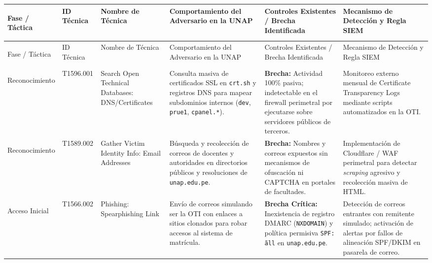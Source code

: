 \begin{center}
\footnotesize
\setlength{\tabcolsep}{2.5pt}
\renewcommand{\arraystretch}{1.28}
\begin{longtable}{>{\bfseries\raggedright\arraybackslash}p{2.4cm} >{\ttfamily\raggedright\arraybackslash}p{1.9cm} >{\raggedright\arraybackslash}p{2.3cm} >{\raggedright\arraybackslash}p{2.9cm} >{\raggedright\arraybackslash}p{2.9cm} >{\raggedright\arraybackslash}p{3.1cm}}
\toprule
\rowcolor{outermarginbgcolor}
Fase / Táctica & ID Técnica & Nombre de Técnica & Comportamiento del Adversario en la UNAP & Controles Existentes / Brecha Identificada & Mecanismo de Detección y Regla SIEM \\
\midrule
\endfirsthead
\toprule
\rowcolor{outermarginbgcolor}
Fase / Táctica & ID Técnica & Nombre de Técnica & Comportamiento del Adversario en la UNAP & Controles Existentes / Brecha Identificada & Mecanismo de Detección y Regla SIEM \\
\midrule
\endhead
\bottomrule
\endfoot

Reconocimiento & T1596.001 & Search Open Technical Databases: DNS/\allowbreak Certificates & Consulta masiva de certificados SSL en \texttt{crt.sh} y registros DNS para mapear subdominios internos (\texttt{dev}, \texttt{prue1}, \texttt{cpanel.*}). & \textbf{Brecha:} Actividad 100\% pasiva; indetectable en el firewall perimetral por ejecutarse sobre servidores públicos de terceros. & Monitoreo externo mensual de Certificate Transparency Logs mediante scripts automatizados en la OTI. \\
\midrule

Reconocimiento & T1589.002 & Gather Victim Identity Info: Email Addresses & Búsqueda y recolección de correos de docentes y autoridades en directorios públicos y resoluciones de \texttt{unap.edu.pe}. & \textbf{Brecha:} Nombres y correos expuestos sin mecanismos de ofuscación ni CAPTCHA en portales de facultades. & Implementación de Cloudflare / WAF perimetral para detectar \textit{scraping} agresivo y recolección masiva de HTML. \\
\midrule

Acceso Inicial & T1566.002 & Phishing: Spearphishing Link & Envío de correos simulando ser la OTI con enlaces a sitios clonados para robar accesos al sistema de matrícula. & \textbf{Brecha Crítica:} Inexistencia de registro DMARC (\texttt{NXDOMAIN}) y política permisiva \texttt{SPF: \~all} en \texttt{unap.edu.pe}. & Detección de correos entrantes con remitente simulado; activación de alertas por fallos de alineación SPF/DKIM en pasarela de correo. \\
\midrule


\end{longtable}
\end{center}
